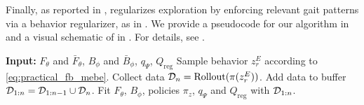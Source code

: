 Finally, as reported in , \method regularizes exploration by enforcing relevant gait patterns via a behavior regularizer, as in . 
We provide a pseudocode for our algorithm in  and a visual schematic of \method in . For details, see .








\begin{algorithm}
\caption{Maximum entropy behavior exploration (\method)}\label{algo:fb-mebe}
\begin{algorithmic}[1]
    \STATE \textbf{Input:} $F_{\theta}$ and $\bar{F}_{\theta}$, $B_\phi$ and $\bar{B}_{\phi}$, $q_\Psi$, $Q_\mathrm{reg}$ 
        \STATE Sample behavior $z_r^E$ according to \cref{eq:practical_fb_mebe}.
        \STATE Collect data ${\mathcal{D}}_n =\mathrm{Rollout}(\pi(z_r^E))$.
        \STATE Add data to buffer ${\mathcal{D}}_{1:n} = {\mathcal{D}}_{1:n-1} \cup {\mathcal{D}}_n$.
        \STATE Fit $F_\theta$, $B_\phi$, policies $\pi_z$, $q_\Psi$ and $Q_\mathrm{reg}$  with ${\mathcal{D}}_{1:n}$.
    \ENDWHILE
\end{algorithmic}
\end{algorithm}